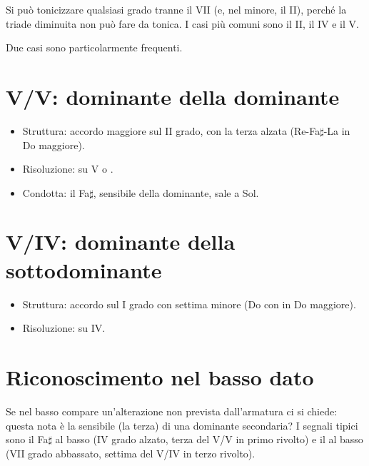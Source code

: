 \begin{regola}
    Si può tonicizzare qualsiasi grado tranne il VII (e, nel minore, il II), perché la triade diminuita non può fare da tonica. I casi più comuni sono il II, il IV e il V.
\end{regola}

Due casi sono particolarmente frequenti.

\section{V/V: dominante della dominante}
\begin{itemize}
    \item Struttura: accordo maggiore sul II grado, con la terza alzata (Re-Fa$\sharp$-La in Do maggiore).
    \item Risoluzione: su V o .
    \item Condotta: il Fa$\sharp$, sensibile della dominante, sale a Sol.
\end{itemize}

\begin{esempio}[V/V in Do maggiore]
	\label{ex:v_di_v}
\end{esempio}

\section{V/IV: dominante della sottodominante}
\begin{itemize}
    \item Struttura: accordo sul I grado con settima minore (Do con \Sibemolle{} in Do maggiore).
    \item Risoluzione: su IV.
\end{itemize}

\begin{esempio}[V/IV in Do maggiore]
	\label{ex:v_di_iv}
\end{esempio}

\section{Riconoscimento nel basso dato}
\label{sec:riconoscimento}

\begin{regola}
    Se nel basso compare un'alterazione non prevista dall'armatura ci si chiede: questa nota è la sensibile (la terza) di una dominante secondaria? I segnali tipici sono il Fa$\sharp$ al basso (IV grado alzato, terza del V/V in primo rivolto) e il \Sibemolle{} al basso (VII grado abbassato, settima del V/IV in terzo rivolto).
\end{regola}
